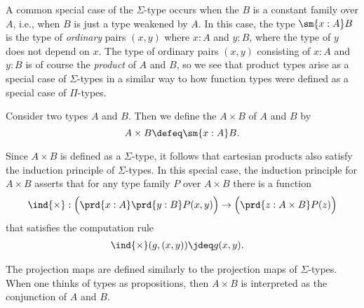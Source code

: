 A common special case of the $\Sigma$-type occurs when the $B$ is a constant family over $A$, i.e., when $B$ is just a type weakened by $A$.
In this case, the type $\sm{x:A}B$ is the type of \emph{ordinary} pairs $(x,y)$ where $x:A$ and $y:B$, where the type of $y$ does not depend on $x$. The type of ordinary pairs $(x,y)$ consisting of $x:A$ and $y:B$ is of course the \emph{product} of $A$ and $B$, so we see that product types arise as a special case of $\Sigma$-types in a similar way to how function types were defined as a special case of $\Pi$-types.

\begin{defn}
  Consider two types $A$ and $B$. Then we define the  $A\times B$ of $A$ and $B$ by
  \begin{equation*}
    A\times B \defeq \sm{x:A}B.
  \end{equation*}
\end{defn}

\begin{rmk}
  Since $A\times B$ is defined as a $\Sigma$-type, it follows that cartesian products also satisfy the induction principle of $\Sigma$-types. In this special case, the induction principle for $A\times B$ asserts that for any type family $P$ over $A\times B$ there is a function
\begin{equation*}
\ind{\times} : \Big(\prd{x:A}\prd{y:B}P(x,y)\Big)\to\Big(\prd{z:A\times B} P(z)\Big)
\end{equation*}
that satisfies the computation rule
\begin{align*}
\ind{\times}(g,(x,y)) & \jdeq g(x,y).
\end{align*}
\end{rmk}

The projection maps are defined similarly to the projection maps of $\Sigma$-types. When one thinks of types as propositions, then $A\times B$ is interpreted as the conjunction of $A$ and $B$.


